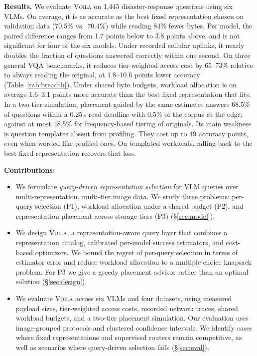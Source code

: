 \documentclass[10pt,conference]{IEEEtran}
\newcommand{\system}{\textsc{Voila}\xspace}
\begin{document}
\textbf{Results.} We evaluate \system on 1,445 disaster-response questions using six VLMs. On average, it is as accurate as the best fixed representation chosen on validation data (70.5\% vs.\ 70.4\%) while reading 84\% fewer bytes. Per model, the paired difference ranges from 1.7 points below to 3.8 points above, and is not significant for four of the six models. Under recorded cellular uplinks, it nearly doubles the fraction of questions answered correctly within one second. On three general VQA benchmarks, it reduces tier-weighted access cost by 65--73\% relative to always reading the original, at 1.8--10.6 points lower accuracy (Table~\ref{tab:breadth}). Under shared byte budgets, workload allocation is on average 1.6--3.1 points more accurate than the best fixed representation that fits. In a two-tier simulation, placement guided by the same estimates answers 68.5\% of questions within a 0.25\,s read deadline with 0.5\% of the corpus at the edge, against at most 48.5\% for frequency-based tiering of originals. %
Its main weakness is question templates absent from profiling. They cost up to 49 accuracy points, even when worded like profiled ones. On templated workloads, falling back to the best fixed representation recovers that loss.

\noindent \textbf{Contributions}:
\begin{itemize}
\item We formulate \emph{query-driven representation selection} for VLM queries over multi-representation, multi-tier image data. We study three problems: per-query selection (P1), workload allocation under a shared budget (P2), and representation placement across storage tiers (P3) (\S\ref{sec:model}).

\item We design \system, a representation-aware query layer that combines a representation catalog, calibrated per-model success estimators, and cost-based optimizers. We bound the regret of per-query selection in terms of estimator error and reduce workload allocation to a multiple-choice knapsack problem. For P3 we give a greedy placement advisor rather than an optimal solution (\S\ref{sec:design}).

\item We evaluate \system across six VLMs and four datasets, using measured payload sizes, tier-weighted access costs, recorded network traces, shared workload budgets, and a two-tier placement simulation. Our evaluation uses image-grouped protocols and clustered confidence intervals. We identify cases where fixed representations and supervised routers remain competitive, as well as scenarios where query-driven selection fails (\S\ref{sec:eval}).
\end{itemize}
\end{document}

